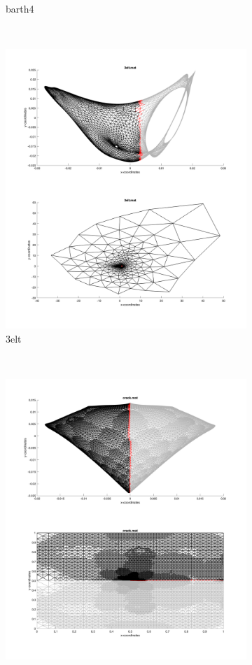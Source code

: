 \begin{figure}[H]
\begin{subfigure}{0.5\textwidth}
		\caption{barth4}
		\label{fig:barth4_spc}
	\end{subfigure}\\
	\begin{subfigure}{0.5\textwidth}
		\includegraphics[width=\textwidth]{./media/3elt_eigen.png}
		\caption{3elt}
		\label{fig:metis_crack}
	\end{subfigure}%
	~
	\begin{subfigure}{0.5\textwidth}
		\includegraphics[width=\textwidth]{./media/crack_eigen.png}

\end{subfigure}
\end{figure}

